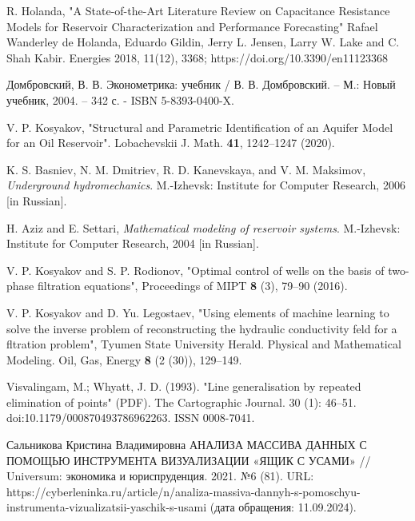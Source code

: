 \documentclass[14pt]{article}
\begin{document}
\begin{thebibliography}{20}
		
		 R. Holanda, "A State-of-the-Art Literature Review on Capacitance
		Resistance Models for Reservoir Characterization
		and Performance Forecasting" Rafael Wanderley de Holanda, Eduardo Gildin, Jerry L. Jensen, Larry W. Lake and C. Shah Kabir. Energies 2018, 11(12), 3368; https://doi.org/10.3390/en11123368
		
		 Домбровский, В. В. Эконометрика: учебник / В. В. Домбровский. – М.: Новый учебник, 2004. – 342 с. - ISBN 5-8393-0400-X.
		
		 V. P. Kosyakov, "Structural and Parametric Identification
		of an Aquifer Model for an Oil Reservoir". Lobachevskii J. Math.
		{\bf 41}, 1242--1247 (2020).
		
		 K. S. Basniev, N. M. Dmitriev, R. D. Kanevskaya, and V. M. Maksimov,
		\textit{Underground hydromechanics}. M.-Izhevsk: Institute for
		Computer Research, 2006 [in Russian].
		
		 H. Aziz and E. Settari, \textit{Mathematical modeling of reservoir systems}.
		M.-Izhevsk: Institute for Computer Research, 2004 [in Russian].
		
		 V. P. Kosyakov and S. P. Rodionov, "Optimal control of wells on the basis
		of two-phase filtration equations", Proceedings of MIPT {\bf 8} (3),
		79--90 (2016).
		
		 V. P. Kosyakov and  D. Yu. Legostaev, "Using elements of machine learning to
		solve the inverse problem of reconstructing the hydraulic 
		conductivity feld for a fltration problem", Tyumen State University
		Herald. Physical and Mathematical Modeling. Oil, Gas, Energy {\bf 8}
		(2 (30)), 129--149.
		
		  Visvalingam, M.; Whyatt, J. D. (1993). "Line generalisation by repeated elimination of points" (PDF). The Cartographic Journal. 30 (1): 46–51. doi:10.1179/000870493786962263. ISSN 0008-7041.
		
		  Сальникова Кристина Владимировна АНАЛИЗА МАССИВА ДАННЫХ С ПОМОЩЬЮ ИНСТРУМЕНТА ВИЗУАЛИЗАЦИИ «ЯЩИК С УСАМИ» // Universum: экономика и юриспруденция. 2021. №6 (81). URL: https://cyberleninka.ru/article/n/analiza-massiva-dannyh-s-pomoschyu-instrumenta-vizualizatsii-yaschik-s-usami (дата обращения: 11.09.2024).
		
\end{thebibliography}
	

	
\end{document}
